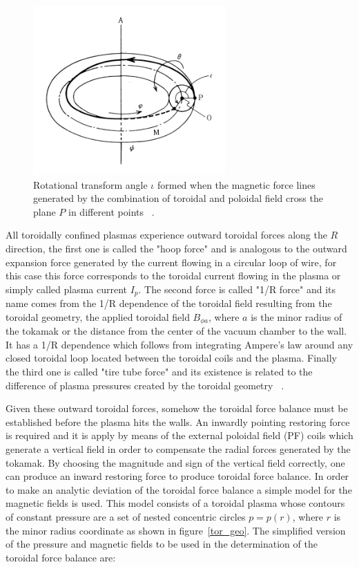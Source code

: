 \begin{figure}
	\centering
	\includegraphics[width=0.655\textwidth]{Chp1/rotational_angle.png}
	\caption{Rotational transform angle $\iota$ formed when the magnetic force lines generated by the combination of toroidal and poloidal field cross the plane $P$ in different points  ~\cite[Chapter~3]{Miyamoto2011}. \label{rot_angle}}
\end{figure}

 All toroidally confined plasmas experience  outward toroidal forces along the $R$ direction, the first one is called the "hoop force" and is analogous to  the outward expansion force generated by the current flowing in a circular loop of wire, for this case this force corresponds to the toroidal current flowing in the plasma or simply called plasma current $I_p$. The second force is called "1/R force" and its name comes from the 1/R dependence of the toroidal field resulting from the toroidal geometry, the applied toroidal field $B_{\phi a}$,  where $a$ is the minor radius of the tokamak or the distance from the center of the vacuum chamber to the wall. It has a 1/R dependence which follows from integrating Ampere's law around any closed toroidal loop located between the toroidal coils and the plasma. Finally the third one is called "tire tube force" and its existence is related to the difference of plasma pressures created by the toroidal geometry ~\cite[Chapter~11]{Freidberg2007}. \smallskip 
 
Given these outward toroidal forces, somehow the  toroidal force balance must be established before the plasma hits the walls. An inwardly pointing restoring force is required and it is apply by means of the external poloidal field (PF) coils which generate a vertical field in order to compensate the radial forces generated by the tokamak.  By choosing the magnitude and sign of the vertical field correctly, one can produce an inward restoring force to produce toroidal force balance. In order to make an analytic deviation of the toroidal force balance a simple model for the magnetic fields is used. This model consists of a toroidal plasma whose contours of constant pressure are a set of nested concentric circles $p=p(r)$, where $r$ is the minor radius coordinate as shown in figure~\ref{tor_geo}. The simplified version of the pressure and magnetic fields to be used in the determination of the toroidal force balance are:

